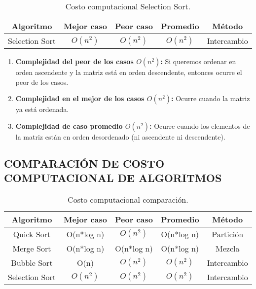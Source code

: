 \documentclass{article}
\begin{document}
    \begin{table}[H]
        \centering
        \begin{tabular}{||c c c c c||} 
         \hline
         \textbf{Algoritmo} & \textbf{Mejor caso} & \textbf{Peor caso} & \textbf{Promedio} & \textbf{Método} \\ [0.5ex] 
         \hline\hline
         Selection Sort & \(O(n^2)\) & \(O(n^2)\) & \(O(n^2)\) & Intercambio \\ [0.5ex] 
         \hline
        \end{tabular}
        \caption{Costo computacional Selection Sort.}
        \label{table:dataSelectionSort}
    \end{table}
    
    \begin{enumerate}
            \item \textbf{Complejidad del peor de los casos \(O(n^2)\):} Si queremos ordenar en orden ascendente y la matriz está en orden descendente, entonces ocurre el peor de los casos.
            
            \item \textbf{Complejidad en el mejor de los casos \(O(n^2)\):} Ocurre cuando la matriz ya está ordenada.
            
            \item \textbf{Complejidad de caso promedio \(O(n^2)\):} Ocurre cuando los elementos de la matriz están en orden desordenado (ni ascendente ni descendente).
    \end{enumerate}

    
\subsection{COMPARACIÓN DE COSTO COMPUTACIONAL DE ALGORITMOS}

    \begin{table}[H]
        \centering
        \begin{tabular}{||c c c c c||} 
         \hline
         \textbf{Algoritmo} & \textbf{Mejor caso} & \textbf{Peor caso} & \textbf{Promedio} & \textbf{Método} \\ [0.5ex] 
         \hline\hline
          Quick Sort & O(n*log n) & \(O(n^2)\) & O(n*log n) & Partición \\ [0.5ex]
          Merge Sort & O(n*log n) & O(n*log n) & O(n*log n) & Mezcla \\ [0.5ex] 
          Bubble Sort & O(n) & \(O(n^2)\) & \(O(n^2)\) & Intercambio \\ [0.5ex]  
          Selection Sort & \(O(n^2)\) & \(O(n^2)\) & \(O(n^2)\) & Intercambio \\ [0.5ex]  
         \hline
        \end{tabular}
        \caption{Costo computacional comparación.}
        \label{table:dataComparationSorts}
    \end{table}
\end{document}
